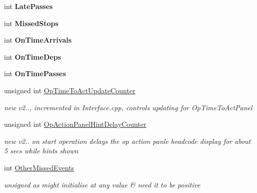 \begin{DoxyCompactItemize}
int {\bfseries Late\+Passes}
\item 
\mbox{\label{class_t_train_controller_a2c6b57b95b0cc74283154eacc0d12818}} 
int {\bfseries Missed\+Stops}
\item 
\mbox{\label{class_t_train_controller_a2672ec65c57cf146962f7838f345440a}} 
int {\bfseries On\+Time\+Arrivals}
\item 
\mbox{\label{class_t_train_controller_aa523bb158234e4dfd86c196c36e59fdd}} 
int {\bfseries On\+Time\+Deps}
\item 
\mbox{\label{class_t_train_controller_a3498a167993b7da117ec243defb56ab4}} 
int {\bfseries On\+Time\+Passes}
\item 
\mbox{\label{class_t_train_controller_a77d198d6770529b3d5fd65f21763f7cb}} 
unsigned int \mbox{\hyperlink{class_t_train_controller_a77d198d6770529b3d5fd65f21763f7cb}{Op\+Time\+To\+Act\+Update\+Counter}}
\begin{DoxyCompactList}\small\item\em new v2.., incremented in Interface.\+cpp, controls updating for Op\+Time\+To\+Act\+Panel \end{DoxyCompactList}\item 
\mbox{\label{class_t_train_controller_a2b1a86606eb0906b85142c5749c999e9}} 
unsigned int \mbox{\hyperlink{class_t_train_controller_a2b1a86606eb0906b85142c5749c999e9}{Op\+Action\+Panel\+Hint\+Delay\+Counter}}
\begin{DoxyCompactList}\small\item\em new v2.. on start operation delays the op action panle headcode display for about 5 secs while hints shown \end{DoxyCompactList}\item 
\mbox{\label{class_t_train_controller_ac4449f3490e36190d510f6960191ce45}} 
int \mbox{\hyperlink{class_t_train_controller_ac4449f3490e36190d510f6960191ce45}{Other\+Missed\+Events}}
\begin{DoxyCompactList}\small\item\em unsigned as might initialise at any value \& need it to be positive \end{DoxyCompactList}\item 

\end{DoxyCompactItemize}
